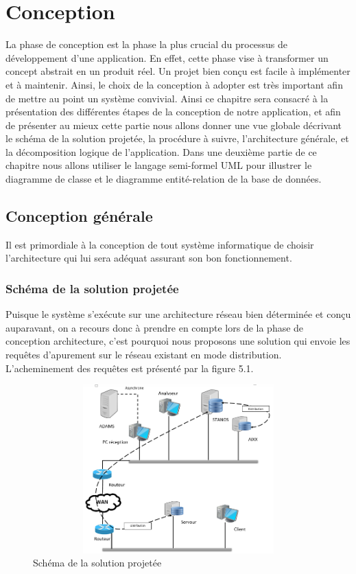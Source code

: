 \chapter{Conception}

La phase de conception est la phase la plus crucial du processus de développement d’une application. En effet, cette phase vise à transformer un concept abstrait en un produit réel. Un projet bien conçu est facile à implémenter et à maintenir. Ainsi, le choix de la conception à adopter est très important afin de mettre au point un système convivial. Ainsi ce chapitre sera consacré à la présentation des différentes étapes de la conception de notre application, et afin de présenter au mieux cette partie nous allons donner une vue globale décrivant le schéma de la solution projetée, la procédure à suivre, l’architecture générale, et la décomposition logique de l’application. Dans une deuxième partie de ce chapitre nous allons utiliser le langage semi-formel UML\cite{cite1} pour illustrer le diagramme de classe et le diagramme entité-relation de la base de données.
\section{Conception générale}
Il est primordiale à la conception de tout système informatique de choisir l’architecture qui lui sera adéquat assurant son bon fonctionnement.

\subsection{Schéma de la solution projetée}
Puisque le système s’exécute sur une architecture réseau bien déterminée et conçu auparavant, on a recours donc à prendre en compte lors de la phase de conception architecture, c’est pourquoi nous proposons une solution qui envoie les requêtes d’apurement sur le réseau existant en mode distribution. L’acheminement des requêtes est présenté par la figure 5.1. 
\begin{figure}[!h]
\begin{center}
\includegraphics[width=17cm,height=6.5cm]{Conception/solution.png}
\end{center}
\caption{Schéma de la solution projetée}
\end{figure}


